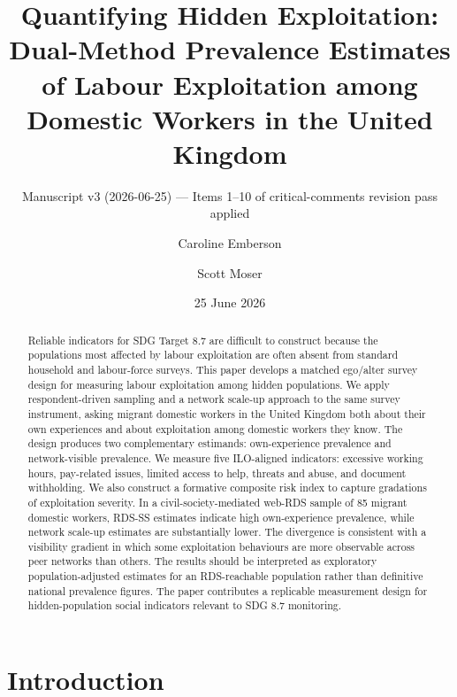 \documentclass[
  12pt,
  letterpaper,
  DIV=11,
  numbers=noendperiod]{scrartcl}
\title{Quantifying Hidden Exploitation: Dual-Method Prevalence Estimates
of Labour Exploitation among Domestic Workers in the United Kingdom}
\subtitle{Manuscript v3 (2026-06-25) --- Items 1--10 of
critical-comments revision pass applied}
\author{Caroline Emberson \and Scott Moser}
\date{25 June 2026}
\begin{document}
\maketitle
\begin{abstract}
Reliable indicators for SDG Target 8.7 are difficult to construct
because the populations most affected by labour exploitation are often
absent from standard household and labour-force surveys. This paper
develops a matched ego/alter survey design for measuring labour
exploitation among hidden populations. We apply respondent-driven
sampling and a network scale-up approach to the same survey instrument,
asking migrant domestic workers in the United Kingdom both about their
own experiences and about exploitation among domestic workers they know.
The design produces two complementary estimands: own-experience
prevalence and network-visible prevalence. We measure five ILO-aligned
indicators: excessive working hours, pay-related issues, limited access
to help, threats and abuse, and document withholding. We also construct
a formative composite risk index to capture gradations of exploitation
severity. In a civil-society-mediated web-RDS sample of 85 migrant
domestic workers, RDS-SS estimates indicate high own-experience
prevalence, while network scale-up estimates are substantially lower.
The divergence is consistent with a visibility gradient in which some
exploitation behaviours are more observable across peer networks than
others. The results should be interpreted as exploratory
population-adjusted estimates for an RDS-reachable population rather
than definitive national prevalence figures. The paper contributes a
replicable measurement design for hidden-population social indicators
relevant to SDG 8.7 monitoring.
\end{abstract}


\section{Introduction}\label{introduction}
\end{document}
